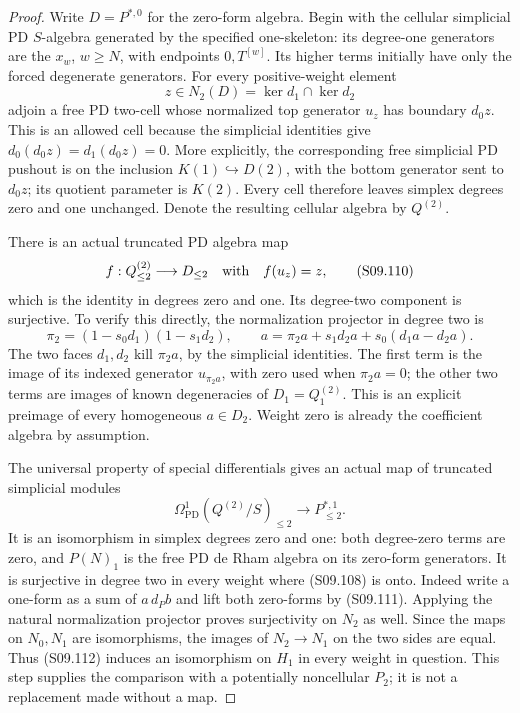 \begin{proof}
Write $D=P^{*,0}$ for the zero-form algebra.  Begin with
the cellular simplicial PD $S$-algebra generated by the
specified one-skeleton: its degree-one generators are
the $x_w$, $w\geq N$, with endpoints $0,T^{[w]}$.
Its higher terms initially have only the forced
degenerate generators.  For every positive-weight
element
\[
                         z\in N_2(D)
                           =\ker d_1\cap\ker d_2
\]
adjoin a free PD two-cell whose normalized top generator
$u_z$ has boundary $d_0z$.  This is an allowed cell
because the simplicial identities give
$d_0(d_0z)=d_1(d_0z)=0$.
More explicitly, the corresponding free simplicial
PD pushout is on the inclusion
$K(1)\hookrightarrow D(2)$, with the bottom generator
sent to $d_0z$; its quotient parameter is $K(2)$.
Every cell therefore leaves simplex degrees zero and
one unchanged.  Denote the resulting cellular algebra
by $Q^{(2)}$.

There is an actual truncated PD algebra map
\[
                  f:Q^{(2)}_{\leq2}\longrightarrow D_{\leq2}
                  \quad\hbox{with}\quad f(u_z)=z,
 \tag{S09.110}
\]
which is the identity in degrees zero and one.
Its degree-two component is surjective.  To verify this
directly, the normalization projector in degree two is
\[
 \pi_2=(1-s_0d_1)(1-s_1d_2),\qquad
 a=\pi_2a+s_1d_2a+s_0(d_1a-d_2a).
 \tag{S09.111}
\]
The two faces $d_1,d_2$ kill $\pi_2a$, by the simplicial
identities.  The first term is the image of its indexed
generator $u_{\pi_2a}$, with zero used when $\pi_2a=0$;
the other two terms are images of known degeneracies
of $D_1=Q^{(2)}_1$.  This is an explicit preimage of
every homogeneous $a\in D_2$.  Weight zero is already
the coefficient algebra by assumption.

The universal property of special differentials gives
an actual map of truncated simplicial modules
\[
      \Omega^1_{\mathrm{PD}}(Q^{(2)}/S)_{\leq2}
                        \longrightarrow P^{*,1}_{\leq2}.
 \tag{S09.112}
\]
It is an isomorphism in simplex degrees zero and one:
both degree-zero terms are zero, and $P(N)_1$ is the
free PD de Rham algebra on its zero-form generators.
It is surjective in degree two in every weight where
(S09.108) is onto.  Indeed write a one-form as a sum
of $a\,d_Pb$ and lift both zero-forms by (S09.111).
Applying the natural normalization projector proves
surjectivity on $N_2$ as well.
Since the maps on $N_0,N_1$ are isomorphisms, the
images of $N_2\to N_1$ on the two sides are equal.
Thus (S09.112) induces an isomorphism on $H_1$ in
every weight in question.  This step supplies the
comparison with a potentially noncellular $P_2$;
it is not a replacement made without a map.


\end{proof}
